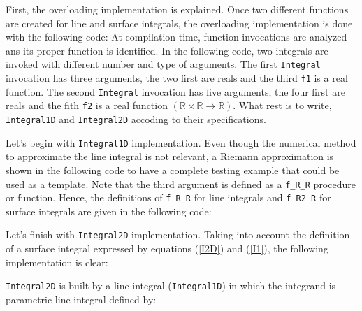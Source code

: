 First, the overloading implementation is explained. Once two different functions are 
created for line and surface integrals, the overloading implementation is done
with the following code: 
\vspace{0.5cm}  
At compilation time, function invocations are analyzed ans its proper function
is identified. In the following code, two integrals are invoked with 
different number and type of arguments.
\vspace{0.5cm} 
The first \texttt{Integral} invocation has three arguments, the two first are reals and the 
third \texttt{f1} is a real function.
The second \texttt{Integral} invocation has five arguments, the four first are reals and 
the fith \texttt{f2} is a real function 
$(\mathbb{R}\times \mathbb{R} \rightarrow \mathbb{R})$.
What rest is to write, \texttt{Integral1D} and \texttt{Integral2D} accoding to their 
specifications.  
\newpage  

Let's begin with  \verb|Integral1D| implementation. 
Even though the numerical method to approximate the line integral is not relevant, 
a Riemann approximation is shown in the following code to have a complete testing
example that could be used as a template. 
\vspace{0.5cm} 
Note that the third argument is defined as a \verb|f_R_R| procedure or function. 
Hence, the definitions of \verb|f_R_R| for line integrals and \verb|f_R2_R|
for surface integrals are given in the following code: 
\vspace{0.5cm} 
 
\newpage  
Let's finish with \verb|Integral2D| implementation. 
Taking into account the definition of a surface integral expressed 
by  equations (\ref{I2D}) and (\ref{I1}), the following implementation is clear: 

\vspace{0.5cm}  
\verb|Integral2D|  is built by a line integral (\verb|Integral1D|) 
in which the integrand is parametric line integral defined by: 
\vspace{0.5cm}   
    
